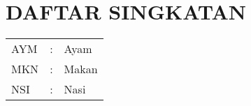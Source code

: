 %
%
%
%

\chapter*{DAFTAR SINGKATAN}
\begin{tabular}{lll}
AYM &:& Ayam\\
MKN &:& Makan\\
NSI &:& Nasi\\
\end{tabular}
